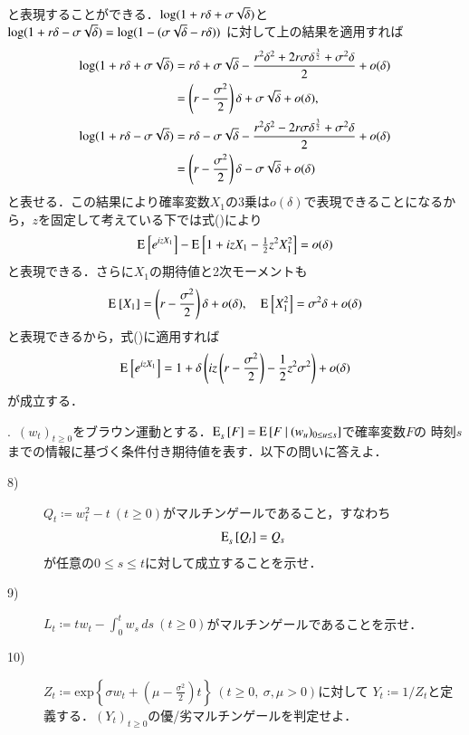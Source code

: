 \begin{description}
\begin{align}
		\end{align}
		と表現することができる．$\Log{(1 + r \delta + \sigma \sqrt{\delta})}$と$\Log{(1 + r \delta - \sigma \sqrt{\delta})} = \Log{(1 - (\sigma \sqrt{\delta} - r \delta))}$
		に対して上の結果を適用すれば
		\begin{align}
			\Log{(1 + r \delta + \sigma \sqrt{\delta})} &= r \delta + \sigma \sqrt{\delta} - \frac{r^2 \delta^2 + 2r \sigma \delta^\frac{3}{2} + \sigma^2 \delta}{2} + o(\delta) \\
				&= \left(r - \frac{\sigma^2}{2}\right)\delta + \sigma \sqrt{\delta} + o(\delta), \\
			\Log{(1 + r \delta - \sigma \sqrt{\delta})} &= r \delta - \sigma \sqrt{\delta} - \frac{r^2 \delta^2 - 2r \sigma \delta^\frac{3}{2} + \sigma^2 \delta}{2} + o(\delta) \\
				&= \left(r - \frac{\sigma^2}{2}\right)\delta - \sigma \sqrt{\delta} + o(\delta)
		\end{align}
		と表せる．この結果により確率変数$X_1$の3乗は$o(\delta)$で表現できることになるから，$z$を固定して考えている下では式()により
		\begin{align}
			\Exp{\exp{izX_1}}{}{} - \Exp{1 + izX_1 - \tfrac{1}{2}z^2X_1^2}{}{} = o(\delta) \label{eq:finance_Q2_2}
		\end{align}
		と表現できる．さらに$X_1$の期待値と2次モーメントも
		\begin{align}
			\Exp{X_1}{}{} = \left(r - \frac{\sigma^2}{2}\right)\delta + o(\delta), \quad \Exp{X_1^2}{}{} = \sigma^2 \delta + o(\delta)
		\end{align}
		と表現できるから，式()に適用すれば
		\begin{align}
			\Exp{\exp{izX_1}}{}{} = 1 + \delta \left(iz\left(r - \frac{\sigma^2}{2}\right) - \frac{1}{2}z^2 \sigma^2 \right) + o(\delta)
		\end{align}
		が成立する．
\end{description}

.\ $(w_t)_{t \geq 0}$をブラウン運動とする．$\Exp{F}{s}{} = \cexp{F}{(w_u)_{0 \leq u \leq s}}$で確率変数$F$の
時刻$s$までの情報に基づく条件付き期待値を表す．以下の問いに答えよ．
\begin{description}
	\item[8)] $Q_t \coloneqq w_t^2 -t\ (t \geq 0)$がマルチンゲールであること，すなわち
		\begin{align}
			\Exp{Q_t}{s}{} = Q_s
		\end{align}
		が任意の$0 \leq s \leq t$に対して成立することを示せ．
	\item[9)] $L_t \coloneqq tw_t - \int_{0}^{t} w_s\, ds\ (t \geq 0)$がマルチンゲールであることを示せ．
	\item[10)] $Z_t \coloneqq \mathrm{exp}\left\{\sigma w_t + \left(\mu-\frac{\sigma^2}{2}\right)t\right\}\ (t \geq 0,\ \sigma, \mu > 0)$に対して
		$Y_t \coloneqq 1/Z_t$と定義する．$(Y_t)_{t \geq 0}$の優/劣マルチンゲールを判定せよ．
\end{description}

